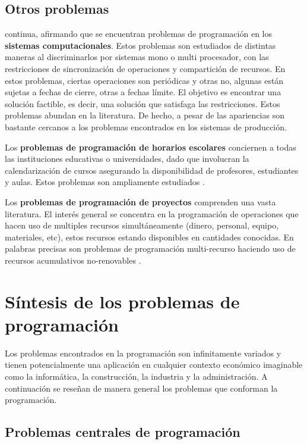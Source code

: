 \documentclass[spanish,draft,12pt,headsepline,footsepline,paper=letter]{scrreprt}
\begin{document}
\subsection{Otros problemas}
\label{otros_problemas}

\citet[p.~7]{TKindt2002} continua, afirmando que se encuentran problemas de programación en los \textbf{sistemas computacionales}. Estos problemas son estudiados de distintas maneras al discriminarlos por sistemas mono o multi procesador, con las restricciones de sincronización de operaciones y compartición de recursos. En estos problemas, ciertas operaciones son periódicas y otras no, algunas están sujetas a fechas de cierre, otras a fechas límite. El objetivo es encontrar una solución factible, es decir, una solución que satisfaga las restricciones. Estos problemas abundan en la literatura. De hecho, a pesar de las apariencias son bastante cercanos a los problemas encontrados en los sistemas de producción.

Los \textbf{problemas de programación de horarios escolares} conciernen a todas las instituciones educativas o universidades, dado que involucran la calendarización de cursos asegurando la disponibilidad de profesores, estudiantes y aulas. Estos problemas son ampliamente estudiados \citep[p.~7]{TKindt2002}.

Los \textbf{problemas de programación de proyectos} comprenden una vasta literatura. El interés general se concentra en la programación de operaciones que hacen uso de multiples recursos simultáneamente (dinero, personal, equipo, materiales, etc), estos recursos estando disponibles en cantidades conocidas. En palabras precisas son problemas de programación multi-recurso haciendo uso de recursos acumulativos no-renovables \citep[p.~7]{TKindt2002}.

\section{Síntesis de los problemas de programación}
\label{sintesis_problemas_programacion}

Los problemas encontrados en la programación son infinitamente variados y tienen potencialmente una aplicación en cualquier contexto económico imaginable como la informática, la construcción, la industria y la administración. A continuación se reseñan de manera general los problemas que conforman la programación.

\subsection{Problemas centrales de programación}
\label{problemas_centrales_programación}
\end{document}
